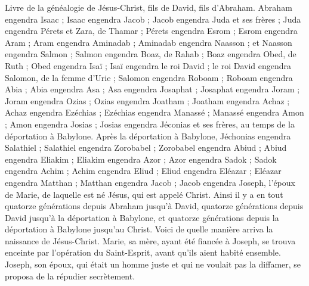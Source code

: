 \begin{multicols}{2}
\VerseOne{}Livre de la généalogie de Jésus-Christ, fils de David, fils d’Abraham.
Abraham engendra Isaac ; Isaac engendra Jacob ; Jacob engendra Juda et ses frères ;
Juda engendra Pérets et Zara, de Thamar ; Pérets engendra Esrom ; Esrom engendra Aram ;
Aram engendra Aminadab ; Aminadab engendra Naasson ; et Naasson engendra Salmon ;
Salmon engendra Boaz, de Rahab{} ; Boaz engendra Obed, de Ruth{} ; Obed engendra Isaï ;
Isaï engendra le roi David ; le roi David engendra Salomon, de la femme d'Urie ;
Salomon engendra Roboam ; Roboam engendra Abia ; Abia engendra Asa ;
Asa engendra Josaphat ; Josaphat engendra Joram ; Joram engendra Ozias ;
Ozias engendra Joatham ; Joatham engendra Achaz ; Achaz engendra Ezéchias ;
Ezéchias engendra Manassé ; Manassé engendra Amon ; Amon engendra Josias ;
Josias engendra Jéconias et ses frères, au temps de la déportation à Babylone.
Après la déportation à Babylone, Jéchonias engendra Salathiel ; Salathiel engendra Zorobabel ;
Zorobabel engendra Abiud ; Abiud engendra Eliakim ; Eliakim engendra Azor ;
Azor engendra Sadok ; Sadok engendra Achim ; Achim engendra Eliud ;
Eliud engendra Eléazar ; Eléazar engendra Matthan ; Matthan engendra Jacob ;
Jacob engendra Joseph, l’époux de Marie, de laquelle est né Jésus, qui est appelé Christ{}.
Ainsi il y a en tout quatorze générations depuis Abraham jusqu'à David, quatorze générations depuis David jusqu'à la déportation à Babylone, et quatorze générations depuis la déportation à Babylone jusqu'au Christ.
Voici de quelle manière arriva la naissance de Jésus-Christ. Marie, sa mère, ayant été fiancée à Joseph, se trouva enceinte par l’opération du Saint-Esprit, avant qu'ils aient habité ensemble.
Joseph, son époux, qui était un homme juste et qui ne voulait pas la diffamer, se proposa de la répudier secrètement.

\end{multicols}
